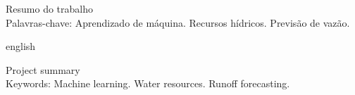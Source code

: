\documentclass[
        oneside,      %
        english,			
        brazil			 
        ]{abntbibufjf}
\begin{document}



\begin{epigrafemais} %
\end{epigrafemais}



\begin{resumo}

Resumo do trabalho \\[18pt]
Palavras-chave: Aprendizado de máquina. Recursos hídricos. Previsão de vazão. %
\end{resumo}
 
 
\begin{resumo}[ABSTRACT]
 \begin{otherlanguage*}{english}

Project summary \\[18pt]
Keywords: Machine learning. Water resources. Runoff forecasting. %
 \end{otherlanguage*}
\end{resumo}




\end{document}
